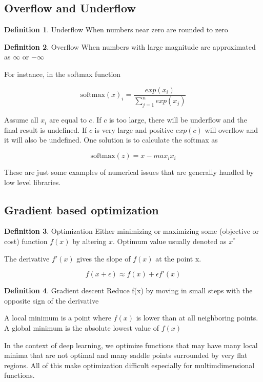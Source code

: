 \documentclass{article}
\theoremstyle{definition}
\newtheorem{definition}{Definition}[section]
\begin{document}
\subsection{Overflow and Underflow}

\begin{definition}{Underflow}
When numbers near zero are rounded to zero
\end{definition}

\begin{definition}{Overflow}
When numbers with large magnitude are approximated as $\infty$ or $-\infty$
\end{definition}

For instance, in the softmax function

$$ \textrm{softmax}(x)_i = \frac{exp(x_i)}{\sum^n_{j=1}exp(x_j)} $$

Assume all $x_i$ are equal to $c$. If $c$ is too large, there will be underflow and the final result is undefined. If $c$ is very large and positive $exp(c)$ will overflow and it will also be undefined. One solution is to calculate the softmax as

$$ \textrm{softmax}(z) = x - max_ix_i $$

These are just some examples of numerical issues that are generally handled by low level libraries.

\subsection{Gradient based optimization}

\begin{definition}{Optimization}
Either minimizing or maximizing some (objective or cost) function $f(x)$ by altering $x$. Optimum value usually denoted as $x^*$
\end{definition}

The derivative $f'(x)$ gives the slope of $f(x)$ at the point x.

$$ f(x + \epsilon) \approx f(x) + \epsilon f'(x) $$

\begin{definition}{Gradient descent}
Reduce f(x) by moving in small steps with the opposite sign of the derivative
\end{definition}

A local minimum is a point where $f(x)$ is lower than at all neighboring points. A global minimum is the absolute lowest value of $f(x)$

In the context of deep learning, we optimize functions that may have many local minima that are not optimal and many saddle points surrounded by very flat regions. All of this make optimization difficult especially for multimdimensional functions.
\end{document}
